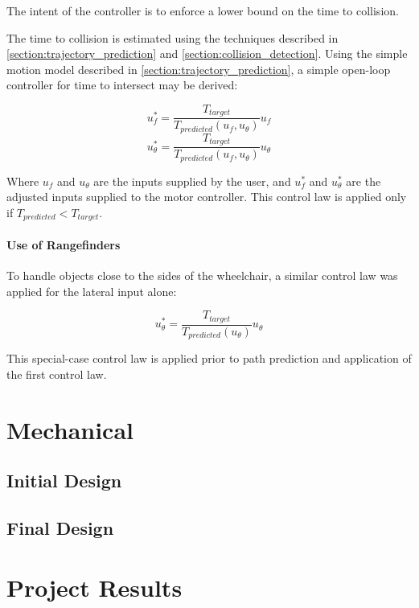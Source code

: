 \documentclass[oneside,final,a4paper]{report}
\begin{document}
The intent of the controller is to enforce a lower bound on the time to collision.  

The time to collision is estimated using the techniques described in \ref{section:trajectory_prediction} and \ref{section:collision_detection}.  Using the simple motion model described in \ref{section:trajectory_prediction}, a simple open-loop controller for time to intersect may be derived:

\begin{equation}
u_f^* = \frac{T_{target}}{T_{predicted}(u_f, u_\theta)} u_f
\end{equation}
\begin{equation}
u_\theta^* = \frac{T_{target}}{T_{predicted}(u_f, u_\theta)} u_\theta
\end{equation}

Where $u_f$ and $u_\theta$ are the inputs supplied by the user, and $u_f^*$ and $u_\theta^*$ are the adjusted inputs supplied to the motor controller.  This control law is applied only if $T_{predicted} < T_{target}$.

\subsubsection{Use of Rangefinders}
To handle objects close to the sides of the wheelchair, a similar control law was applied for the lateral input alone:

\begin{equation}
u_\theta^* = \frac{T_{target}}{T_{predicted}(u_\theta)} u_\theta
\end{equation}

This special-case control law is applied prior to path prediction and application of the first control law.

\chapter{Mechanical}

\section{Initial Design}

\section{Final Design}


\chapter{Project Results}
\end{document}

